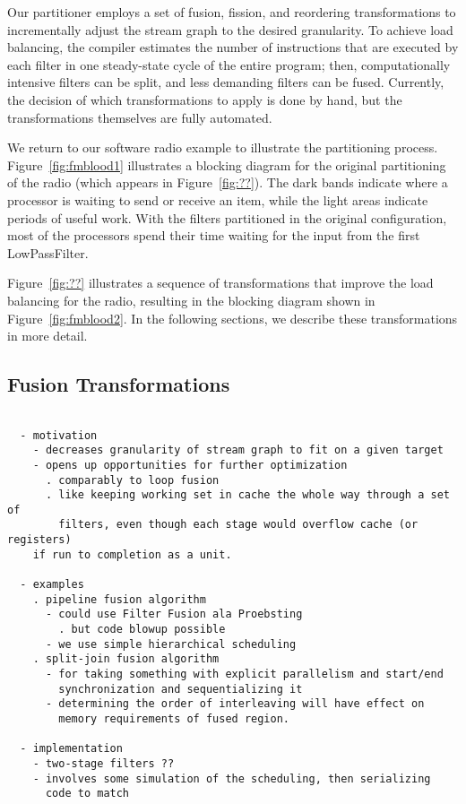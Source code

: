 Our partitioner employs a set of fusion, fission, and reordering
transformations to incrementally adjust the stream graph to the
desired granularity.  To achieve load balancing, the compiler
estimates the number of instructions that are executed by each filter
in one steady-state cycle of the entire program; then, computationally
intensive filters can be split, and less demanding filters can be
fused.  Currently, the decision of which transformations to apply is
done by hand, but the transformations themselves are fully automated.

We return to our software radio example to illustrate the partitioning
process.  Figure~\ref{fig:fmblood1} illustrates a blocking diagram for
the original partitioning of the radio (which appears in
Figure~\ref{fig:??}).  The dark bands indicate where a processor is
waiting to send or receive an item, while the light areas indicate
periods of useful work.  With the filters partitioned in the original
configuration, most of the processors spend their time waiting for the
input from the first LowPassFilter.

Figure~\ref{fig:??} illustrates a sequence of transformations that
improve the load balancing for the radio, resulting in the blocking
diagram shown in Figure~\ref{fig:fmblood2}.   In the following sections, we describe these
transformations in more detail.


\subsection{Fusion Transformations}

\begin{verbatim}

  - motivation
    - decreases granularity of stream graph to fit on a given target
    - opens up opportunities for further optimization
      . comparably to loop fusion
      . like keeping working set in cache the whole way through a set of
        filters, even though each stage would overflow cache (or registers)
	if run to completion as a unit.

  - examples
    . pipeline fusion algorithm
      - could use Filter Fusion ala Proebsting
        . but code blowup possible
      - we use simple hierarchical scheduling
    . split-join fusion algorithm
      - for taking something with explicit parallelism and start/end
        synchronization and sequentializing it
      - determining the order of interleaving will have effect on
        memory requirements of fused region.

  - implementation
    - two-stage filters ??
    - involves some simulation of the scheduling, then serializing
      code to match

\end{verbatim}

